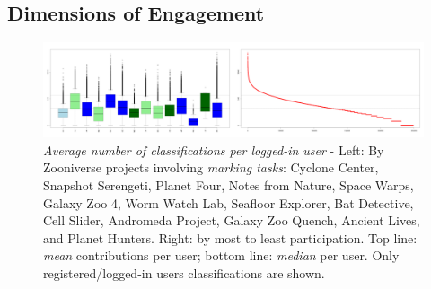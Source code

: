 \documentclass{sigchi}
\begin{document}



\subsection{Dimensions of Engagement}

\begin{figure}[htbp]
\centering
\includegraphics[width=1.0\textwidth]{imgs/engagement_sum_median_mean_width.png}
\caption{\emph{Average number of classifications per logged-in user} - Left: By Zooniverse projects involving \emph{marking tasks}: Cyclone Center, Snapshot Serengeti, Planet Four, Notes from Nature, Space Warps, Galaxy Zoo 4, Worm Watch Lab, Seafloor Explorer, Bat Detective, Cell Slider, Andromeda Project, Galaxy Zoo Quench, Ancient Lives, and Planet Hunters. Right: by most to least participation. Top line: \emph{mean} contributions per user; bottom line: \emph{median} per user. Only registered/logged-in users classifications are shown.}
\label{fig:cpu}
\end{figure}
\end{document}
